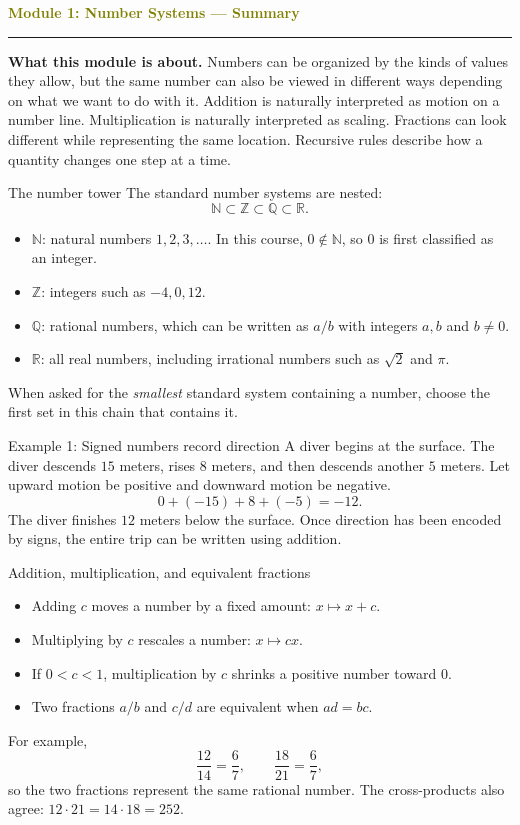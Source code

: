 \documentclass[11pt]{article}
\newcommand{\summaryhead}[2]{%
  \clearpage
  {\Large\bfseries\textcolor{olive}{Module #1: #2 — Summary}}\par
  \vspace{2pt}\textcolor{gold}{\rule{\linewidth}{1.2pt}}\par\smallskip
}
\begin{document}
\summaryhead{1}{Number Systems}

\textbf{What this module is about.} Numbers can be organized by the kinds of values they allow, but the same number can also be viewed in different ways depending on what we want to do with it. Addition is naturally interpreted as motion on a number line. Multiplication is naturally interpreted as scaling. Fractions can look different while representing the same location. Recursive rules describe how a quantity changes one step at a time.

\begin{keybox}{The number tower}
The standard number systems are nested:
\[
\mathbb N\subset \mathbb Z\subset \mathbb Q\subset \mathbb R.
\]
\begin{itemize}
\item \(\mathbb N\): natural numbers \(1,2,3,\ldots\). In this course, \(0\notin\mathbb N\), so \(0\) is first classified as an integer.
\item \(\mathbb Z\): integers such as \(-4,0,12\).
\item \(\mathbb Q\): rational numbers, which can be written as \(a/b\) with integers \(a,b\) and \(b\ne0\).
\item \(\mathbb R\): all real numbers, including irrational numbers such as \(\sqrt2\) and \(\pi\).
\end{itemize}
When asked for the \emph{smallest} standard system containing a number, choose the first set in this chain that contains it.
\end{keybox}

\begin{examplebox}{Example 1: Signed numbers record direction}
A diver begins at the surface. The diver descends \(15\) meters, rises \(8\) meters, and then descends another \(5\) meters. Let upward motion be positive and downward motion be negative.
\[
0+(-15)+8+(-5)=-12.
\]
The diver finishes \(12\) meters below the surface. Once direction has been encoded by signs, the entire trip can be written using addition.
\end{examplebox}

\begin{keybox}{Addition, multiplication, and equivalent fractions}
\begin{itemize}
\item Adding \(c\) moves a number by a fixed amount: \(x\mapsto x+c\).
\item Multiplying by \(c\) rescales a number: \(x\mapsto cx\).
\item If \(0<c<1\), multiplication by \(c\) shrinks a positive number toward \(0\).
\item Two fractions \(a/b\) and \(c/d\) are equivalent when \(ad=bc\).
\end{itemize}
For example,
\[
\frac{12}{14}=\frac67,\qquad \frac{18}{21}=\frac67,
\]
so the two fractions represent the same rational number. The cross-products also agree: \(12\cdot21=14\cdot18=252\).
\end{keybox}
\end{document}
